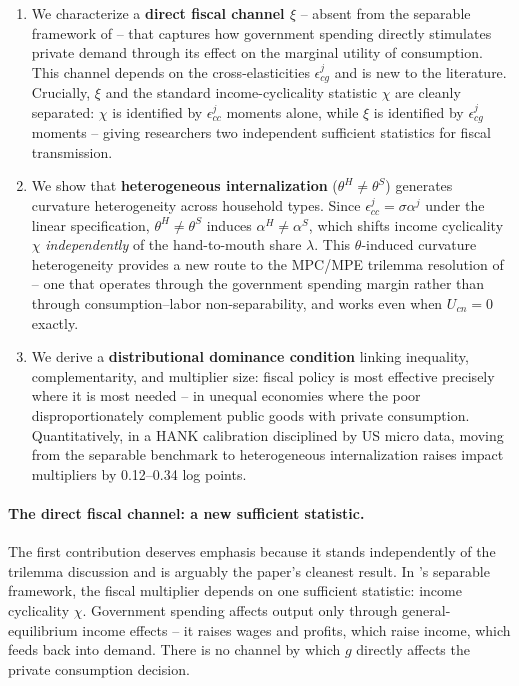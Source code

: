 \begin{enumerate}[leftmargin=1.6em]
  \item We characterize a \textbf{direct fiscal channel $\xi$} -- absent from
    the separable framework of \bilbiie{} -- that captures how government
    spending directly stimulates private demand through its effect on the
    marginal utility of consumption. This channel depends on the
    cross-elasticities $\epsilon^{j}_{cg}$ and is new to the literature.
    Crucially, $\xi$ and the standard income-cyclicality statistic $\chi$ are
    cleanly separated: $\chi$ is identified by $\epsilon^{j}_{cc}$ moments alone,
    while $\xi$ is identified by $\epsilon^{j}_{cg}$ moments -- giving
    researchers two independent sufficient statistics for fiscal transmission.
  \item We show that \textbf{heterogeneous internalization}
    ($\theta^{H}\neq\theta^{S}$) generates curvature heterogeneity across
    household types. Since $\epsilon^{j}_{cc}=\sigma\alpha^{j}$ under the linear
    specification, $\theta^{H}\neq\theta^{S}$ induces
    $\alpha^{H}\neq\alpha^{S}$, which shifts income cyclicality $\chi$
    \emph{independently} of the hand-to-mouth share $\lambda$. This $\theta$-induced
    curvature heterogeneity provides a new route to the MPC/MPE trilemma
    resolution of \auclert{} -- one that operates through the government
    spending margin rather than through consumption--labor non-separability,
    and works even when $U_{cn}=0$ exactly.
  \item We derive a \textbf{distributional dominance condition} linking
    inequality, complementarity, and multiplier size: fiscal policy is most
    effective precisely where it is most needed -- in unequal economies where
    the poor disproportionately complement public goods with private
    consumption. Quantitatively, in a HANK calibration disciplined by US micro
    data, moving from the separable benchmark to heterogeneous internalization
    raises impact multipliers by 0.12--0.34 log points.
\end{enumerate}

\paragraph{The direct fiscal channel: a new sufficient statistic.}
The first contribution deserves emphasis because it stands independently of the
trilemma discussion and is arguably the paper's cleanest result. In \bilbiie{}'s
separable framework, the fiscal multiplier depends on one sufficient statistic:
income cyclicality $\chi$. Government spending affects output only through
general-equilibrium income effects -- it raises wages and profits, which raise
\HtM{} income, which feeds back into demand. There is no channel by which $g$
directly affects the private consumption decision.

